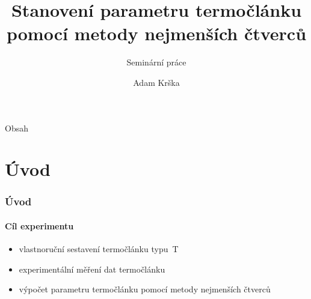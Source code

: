\documentclass[smaller,aspectratio=1610,handout]{beamer}
\author[A. Krška]{Adam Krška}
\title[Stanovení parametru termočlánku]{Stanovení parametru termočlánku pomocí
metody nejmenších čtverců}
\subtitle{Seminární práce}
\institute[GSS Mikulov]{Gymnázium a střední odborná škola Mikulov}
\date{}
\begin{document}
\frame[plain]{\titlepage}

\begin{frame}{Obsah}
	\tableofcontents
\end{frame}

\section{Úvod}
\begin{frame}
	\frametitle{Úvod}
	\framesubtitle{Cíl experimentu}
	\begin{itemize}
		\item vlastnoruční sestavení termočlánku typu~T
		\item experimentální měření dat termočlánku
		\item výpočet parametru termočlánku pomocí metody nejmenších čtverců
	\end{itemize}	
\end{frame}

\end{document}
